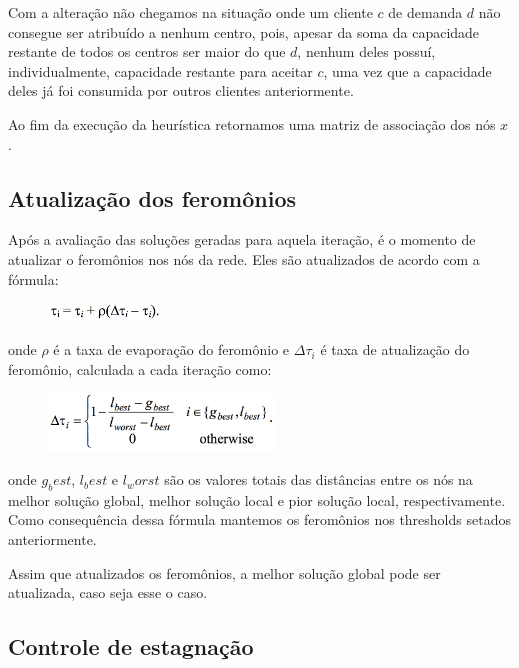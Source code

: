 Com a alteração não chegamos na situação onde um cliente $c$ de demanda $d$ não consegue ser atribuído a nenhum centro, pois, apesar da soma da capacidade restante de todos os centros ser maior do que $d$, nenhum deles possuí, individualmente, capacidade restante para aceitar $c$, uma vez que a capacidade deles já foi consumida por outros clientes anteriormente.

Ao fim da execução da heurística retornamos uma matriz de associação dos nós $x$.

\subsection{Atualização dos feromônios} \label{sub:update-pheromone}

Após a avaliação das soluções geradas para aquela iteração, é o momento de atualizar o feromônios nos nós da rede. Eles são atualizados de acordo com a fórmula:

\begin{figure}[H]	
  \centering
  \includegraphics[width=3cm,keepaspectratio]{images/phero_update.png}
\end{figure}

onde $\rho$ é a taxa de evaporação do feromônio e $\Delta\tau_i$ é taxa de atualização do feromônio, calculada a cada iteração como:

\begin{figure}[H]	
  \centering
  \includegraphics[width=6cm,keepaspectratio]{images/delta_t.png}
\end{figure}

onde $g_best$, $l_best$ e $l_worst$ são os valores totais das distâncias entre os nós na melhor solução global, melhor solução local e pior solução local, respectivamente. Como consequência dessa fórmula mantemos os feromônios nos thresholds setados anteriormente. 

Assim que atualizados os feromônios, a melhor solução global pode ser atualizada, caso seja esse o caso.

\subsection{Controle de estagnação} \label{sub:stagnation}

